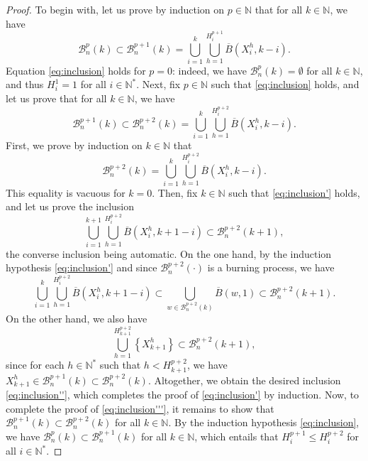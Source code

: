 \documentclass[a4paper,11pt]{article}
\begin{document}
\begin{proof}
To begin with, let us prove by induction on $p\in\mathbb{N}$ that for all $k\in\mathbb{N}$, we have
\begin{equation}\label{eq:inclusion}
\mathcal{B}_n^p(k)\subset\mathcal{B}_n^{p+1}(k)=\bigcup_{i=1}^k\bigcup_{h=1}^{H_i^{p+1}}\overline{B}\left(X_i^h,k-i\right).
\end{equation}
Equation \eqref{eq:inclusion} holds for $p=0$: indeed, we have $\mathcal{B}_n^p(k)=\emptyset$ for all $k\in\mathbb{N}$, and thus $H_i^1=1$ for all $i\in\mathbb{N}^*$.
Next, fix $p\in\mathbb{N}$ such that \eqref{eq:inclusion} holds, and let us prove that for all $k\in\mathbb{N}$, we have
\begin{equation}\label{eq:inclusion'''}
\mathcal{B}_n^{p+1}(k)\subset\mathcal{B}_n^{p+2}(k)=\bigcup_{i=1}^k\bigcup_{h=1}^{H_i^{p+2}}\overline{B}\left(X_i^h,k-i\right).
\end{equation}
First, we prove by induction on $k\in\mathbb{N}$ that
\begin{equation}\label{eq:inclusion'}
\mathcal{B}_n^{p+2}(k)=\bigcup_{i=1}^k\bigcup_{h=1}^{H_i^{p+2}}\overline{B}\left(X_i^h,k-i\right).
\end{equation}
This equality is vacuous for $k=0$.
Then, fix $k\in\mathbb{N}$ such that \eqref{eq:inclusion'} holds, and let us prove the inclusion
\begin{equation}\label{eq:inclusion''}
\bigcup_{i=1}^{k+1}\bigcup_{h=1}^{H_i^{p+2}}\overline{B}\left(X_i^h,k+1-i\right)\subset\mathcal{B}_n^{p+2}(k+1),
\end{equation}
the converse inclusion being automatic.
On the one hand, by the induction hypothesis \eqref{eq:inclusion'} and since $\mathcal{B}_n^{p+2}(\cdot)$ is a burning process, we have
\[\bigcup_{i=1}^k\bigcup_{h=1}^{H_i^{p+2}}\overline{B}\left(X_i^h,k+1-i\right)\subset\bigcup_{w\in\mathcal{B}_n^{p+2}(k)}\overline{B}(w,1)\subset\mathcal{B}_n^{p+2}(k+1).\]
On the other hand, we also have
\[\bigcup_{h=1}^{H_{k+1}^{p+2}}\left\{X_{k+1}^h\right\}\subset\mathcal{B}_n^{p+2}(k+1),\]
since for each $h\in\mathbb{N}^*$ such that $h<H_{k+1}^{p+2}$, we have $X_{k+1}^h\in\mathcal{B}_n^{p+1}(k)\subset\mathcal{B}_n^{p+2}(k)$.
Altogether, we obtain the desired inclusion \eqref{eq:inclusion''}, which completes the proof of \eqref{eq:inclusion'} by induction.
Now, to complete the proof of \eqref{eq:inclusion'''}, it remains to show that $\mathcal{B}_n^{p+1}(k)\subset\mathcal{B}_n^{p+2}(k)$ for all $k\in\mathbb{N}$.
By the induction hypothesis \eqref{eq:inclusion}, we have $\mathcal{B}_n^p(k)\subset\mathcal{B}_n^{p+1}(k)$ for all $k\in\mathbb{N}$, which entails that $H_i^{p+1}\leq H_i^{p+2}$ for all $i\in\mathbb{N}^*$.

\end{proof}
\end{document}
